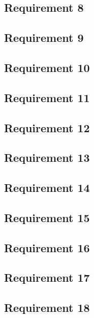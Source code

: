\documentclass[a4paper]{article}
\begin{document}
    \subsection{Requirement 8}
    
    
    \subsection{Requirement 9}
    
    
    \subsection{Requirement 10}
    
    
    \subsection{Requirement 11}
    
    
    \subsection{Requirement 12}
    
    
    \subsection{Requirement 13}
    
    
    \subsection{Requirement 14}
    
    
    \subsection{Requirement 15}
    
    
    \subsection{Requirement 16}
    
    
    \subsection{Requirement 17}
    
    
    \subsection{Requirement 18}
    
\end{document}
